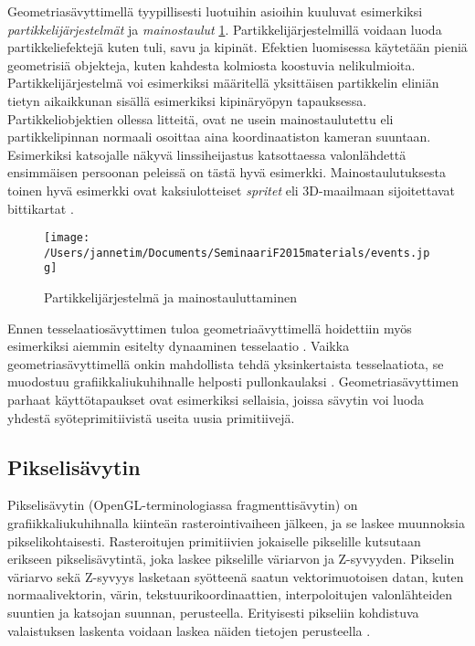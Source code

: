 \documentclass[finnish]{tktltiki2}
\theoremstyle{definition}
\theoremstyle{remark}
\begin{document}
Geometriasävyttimellä tyypillisesti luotuihin asioihin kuuluvat esimerkiksi \emph{partikkelijärjestelmät} ja \emph{mainostaulut} \ref{billboard}. Partikkelijärjestelmillä voidaan luoda partikkeliefektejä kuten tuli, savu ja kipinät. Efektien luomisessa käytetään pieniä geometrisiä objekteja, kuten kahdesta kolmiosta koostuvia nelikulmioita. Partikkelijärjestelmä voi esimerkiksi määritellä yksittäisen partikkelin eliniän tietyn aikaikkunan sisällä esimerkiksi kipinäryöpyn tapauksessa. Partikkeliobjektien ollessa litteitä, ovat ne usein mainostaulutettu eli partikkelipinnan normaali osoittaa aina koordinaatiston kameran suuntaan. Esimerkiksi katsojalle näkyvä linssiheijastus katsottaessa valonlähdettä ensimmäisen persoonan peleissä on tästä hyvä esimerkki. Mainostaulutuksesta toinen hyvä esimerkki ovat kaksiulotteiset \emph{spritet} eli 3D-maailmaan sijoitettavat bittikartat \cite[s. 216-217]{Puh08}.

\begin{figure}[!htpb]
\texttt{[image: /Users/jannetim/Documents/SeminaariF2015materials/events.jpg]}
\caption{Partikkelijärjestelmä ja mainostauluttaminen}
\label{billboard}
\end{figure}

Ennen tesselaatiosävyttimen tuloa geometriaävyttimellä hoidettiin myös esimerkiksi aiemmin esitelty dynaaminen tesselaatio \cite{Mic11}. Vaikka geometriasävyttimellä onkin mahdollista tehdä yksinkertaista tesselaatiota, se muodostuu grafiikkaliukuhihnalle helposti pullonkaulaksi \cite{Sch14}. Geometriasävyttimen parhaat käyttötapaukset ovat esimerkiksi sellaisia, joissa sävytin voi luoda yhdestä syöteprimitiivistä useita uusia primitiivejä.

\subsection{Pikselisävytin}

Pikselisävytin (OpenGL-terminologiassa fragmenttisävytin) on grafiikkaliukuhihnalla kiinteän rasterointivaiheen jälkeen, ja se laskee muunnoksia pikselikohtaisesti. Rasteroitujen primitiivien jokaiselle pikselille kutsutaan erikseen pikselisävytintä, joka laskee pikselille väriarvon ja Z-syvyyden. Pikselin väriarvo sekä Z-syvyys lasketaan syötteenä saatun vektorimuotoisen datan, kuten normaalivektorin, värin, tekstuurikoordinaattien, interpoloitujen valonlähteiden suuntien ja katsojan suunnan, perusteella. Erityisesti pikseliin kohdistuva valaistuksen laskenta voidaan laskea näiden tietojen perusteella \cite{Puh08}.
\end{document}
